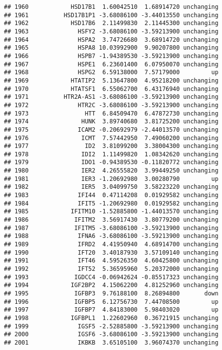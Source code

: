 \documentclass[]{article}
\begin{document}
\begin{verbatim}
## 1960            HSD17B1  1.60042510  1.68914720 unchanging
## 1961          HSD17B1P1 -3.68086100 -3.44013550 unchanging
## 1962            HSD17B6  2.11499830  2.11445300 unchanging
## 1963              HSFY2 -3.68086100 -3.59213900 unchanging
## 1964              HSPA2  3.74726680  3.68914720 unchanging
## 1965              HSPA8 10.03992900  9.90207800 unchanging
## 1966              HSPB7 -1.94389530 -3.59213900 unchanging
## 1967              HSPE1  6.23601400  6.07950070 unchanging
## 1968              HSPG2  6.59138000  7.57179000         up
## 1969            HTATIP2  5.13647800  4.95218200 unchanging
## 1970            HTATSF1  6.55062700  6.43176940 unchanging
## 1971          HTR2A-AS1 -3.68086100 -3.59213900 unchanging
## 1972              HTR2C -3.68086100 -3.59213900 unchanging
## 1973                HTT  6.84509470  6.47872730 unchanging
## 1974               HUNK  3.89740680  3.81725200 unchanging
## 1975              ICAM2 -0.20692979 -2.44013570 unchanging
## 1976               ICMT  7.57442950  7.49060200 unchanging
## 1977                ID2  3.81099200  3.38004300 unchanging
## 1978               IDI2  1.11499820  1.08342620 unchanging
## 1979               IDO1 -0.94389530 -0.11820772 unchanging
## 1980               IER2  4.26555820  3.99449250 unchanging
## 1981               IER3 -1.20692980  3.00280790         up
## 1982               IER5  3.04099750  3.58223220 unchanging
## 1983              IFI44  0.47114208  0.01929582 unchanging
## 1984              IFIT5 -1.20692980  0.01929582 unchanging
## 1985            IFITM10 -1.52885800 -1.44013570 unchanging
## 1986             IFITM2  3.56917430  3.80779200 unchanging
## 1987             IFITM5 -3.68086100 -3.59213900 unchanging
## 1988              IFNA6 -3.68086100 -3.59213900 unchanging
## 1989              IFRD2  4.41950940  4.68914700 unchanging
## 1990              IFT20  3.40187930  3.57109140 unchanging
## 1991              IFT46  4.59526350  4.60425800 unchanging
## 1992              IFT52  5.36595960  5.20372000 unchanging
## 1993             IGDCC4 -0.06942624 -0.85517323 unchanging
## 1994            IGF2BP2  4.15062200  4.81252960 unchanging
## 1995             IGFBP3  9.76188100  8.26894800       down
## 1996             IGFBP5  6.12756730  7.44708500         up
## 1997             IGFBP7  4.84183000  5.98403020         up
## 1998            IGFBPL1  1.22602960  0.36721915 unchanging
## 1999              IGSF5 -2.52885800 -3.59213900 unchanging
## 2000              IGSF6 -3.68086100 -3.59213900 unchanging
## 2001              IKBKB  3.65105100  3.96074370 unchanging

\end{verbatim}
\end{document}
